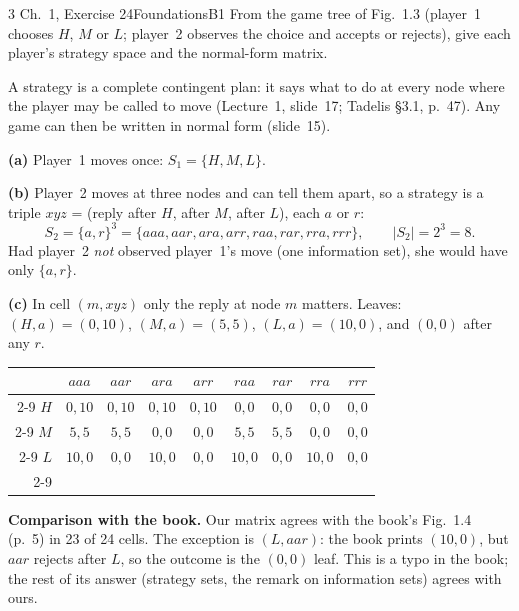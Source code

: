 \begin{exsol}{3}{\MG{} Ch.~1, Exercise 2}{4}{Foundations}{B1}
\asked From the game tree of Fig.~1.3 (player~1 chooses $H$, $M$ or $L$; player~2 observes the
choice and accepts or rejects), give each player's strategy space and the normal-form matrix.

\method A strategy is a complete contingent plan: it says what to do at every node where the
player may be called to move (Lecture~1, slide~17; Tadelis \S3.1, p.~47). Any game can then be
written in normal form (slide~15).

\solution
\textbf{(a)} Player~1 moves once: $S_1 = \{H, M, L\}$.

\textbf{(b)} Player~2 moves at three nodes and can tell them apart, so a strategy is a triple
$xyz$ = (reply after $H$, after $M$, after $L$), each $a$ or $r$:
\[
  S_2 = \{a, r\}^3 = \{aaa, aar, ara, arr, raa, rar, rra, rrr\}, \qquad |S_2| = 2^3 = 8 .
\]
Had player~2 \emph{not} observed player~1's move (one information set), she would have only
$\{a, r\}$.

\textbf{(c)} In cell $(m, xyz)$ only the reply at node $m$ matters. Leaves: $(H,a) = (0,10)$,
$(M,a) = (5,5)$, $(L,a) = (10,0)$, and $(0,0)$ after any $r$.
\begin{center}
\small
\begin{tabular}{r|c|c|c|c|c|c|c|c|}
\multicolumn{1}{r}{} & \multicolumn{1}{c}{$aaa$} & \multicolumn{1}{c}{$aar$} &
\multicolumn{1}{c}{$ara$} & \multicolumn{1}{c}{$arr$} & \multicolumn{1}{c}{$raa$} &
\multicolumn{1}{c}{$rar$} & \multicolumn{1}{c}{$rra$} & \multicolumn{1}{c}{$rrr$}\\ \cline{2-9}
$H$ & $0,10$ & $0,10$ & $0,10$ & $0,10$ & $0,0$ & $0,0$ & $0,0$ & $0,0$ \\ \cline{2-9}
$M$ & $5,5$ & $5,5$ & $0,0$ & $0,0$ & $5,5$ & $5,5$ & $0,0$ & $0,0$ \\ \cline{2-9}
$L$ & $10,0$ & $0,0$ & $10,0$ & $0,0$ & $10,0$ & $0,0$ & $10,0$ & $0,0$ \\ \cline{2-9}
\end{tabular}
\end{center}

\textbf{Comparison with the book.} Our matrix agrees with the book's Fig.~1.4 (p.~5) in 23 of 24
cells. The exception is $(L, aar)$: the book prints $(10, 0)$, but $aar$ rejects after $L$, so the
outcome is the $(0,0)$ leaf. This is a typo in the book; the rest of its answer (strategy sets,
the remark on information sets) agrees with ours.


\end{exsol}
